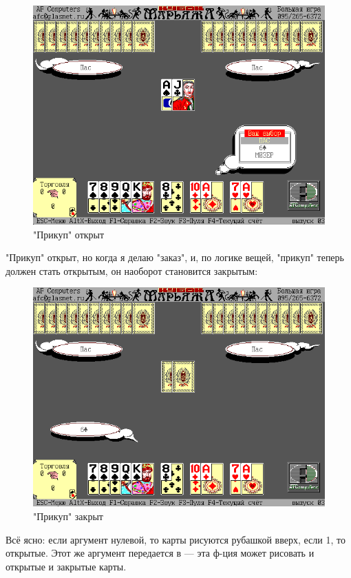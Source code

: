 \begin{figure}[H]
\centering
\includegraphics[scale=\FigScale]{examples/marriage/patch1.png}
\caption{"Прикуп" открыт}
\end{figure}

"Прикуп" открыт, но когда я делаю "заказ", и, по логике вещей, "прикуп" теперь должен стать открытым,
он наоборот становится закрытым:

\begin{figure}[H]
\centering
\includegraphics[scale=\FigScale]{examples/marriage/patch2.png}
\caption{"Прикуп" закрыт}
\end{figure}

Всё ясно: если аргумент  нулевой, то карты рисуются рубашкой вверх, если 1, то открытые.
Этот же аргумент передается в  --- эта ф-ция может рисовать и открытые и закрытые карты.

